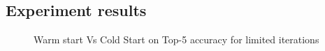 \subsection{Experiment results}

\begin{figure}
  \centering
  \centering
\caption{Warm start Vs Cold Start on Top-5 accuracy for limited iterations}
\end{figure}
